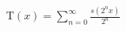 \documentclass[preview]{standalone}
\begin{document}
\begin{align*}
\text{T}(x) = \sum_{n=0}^{\infty} \frac{s(2^n x)}{2^n}
\end{align*}
\end{document}
